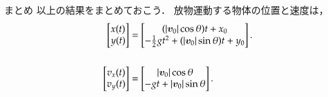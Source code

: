             \begin{mysmallsec}{まとめ}
                以上の結果をまとめておこう．
                放物運動する物体の位置と速度は，
                \begin{align}
                                         \begin{bmatrix}
                                         x(t)   \\
                                         y(t)
                                 \end{bmatrix}
                            &=    \begin{bmatrix}
                                     (|\boldsymbol{v}_{0}| \cos \theta)t +  x_{0}  \\
                                    -\frac{1}{2}g{t}^{2} + (|\boldsymbol{v}_{0}| \sin \theta)t + y_{0}
                                 \end{bmatrix}.
                                 \\ \notag \\
                                                 \begin{bmatrix}
                                         v_{x}(t)  \\
                                         v_{y}(t)
                                 \end{bmatrix}
                            &=    \begin{bmatrix}
                                         |\boldsymbol{v}_{0}| \cos \theta \\
                                         -gt + |\boldsymbol{v}_{0}| \sin \theta
                                 \end{bmatrix}.
                \end{align}
            \end{mysmallsec}



